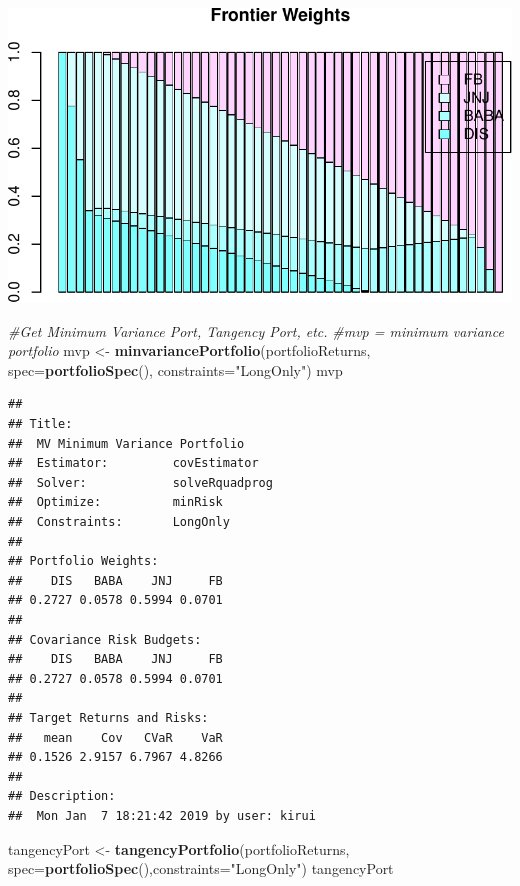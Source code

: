 \documentclass[]{article}
\newenvironment{Shaded}{\begin{snugshade}}{\end{snugshade}}
\newcommand{\KeywordTok}[1]{\textcolor[rgb]{0.13,0.29,0.53}{\textbf{#1}}}
\newcommand{\DataTypeTok}[1]{\textcolor[rgb]{0.13,0.29,0.53}{#1}}
\newcommand{\StringTok}[1]{\textcolor[rgb]{0.31,0.60,0.02}{#1}}
\newcommand{\CommentTok}[1]{\textcolor[rgb]{0.56,0.35,0.01}{\textit{#1}}}
\newcommand{\NormalTok}[1]{#1}
\begin{document}
\includegraphics{Markowitz_Research_Me_files/figure-latex/unnamed-chunk-20-6.pdf}

\begin{Shaded}
\begin{Highlighting}[]
\CommentTok{#Get Minimum Variance Port, Tangency Port, etc.}
\CommentTok{#mvp = minimum variance portfolio}
\NormalTok{mvp <-}\StringTok{ }\KeywordTok{minvariancePortfolio}\NormalTok{(portfolioReturns,}
                            \DataTypeTok{spec=}\KeywordTok{portfolioSpec}\NormalTok{(), }\DataTypeTok{constraints=}\StringTok{"LongOnly"}\NormalTok{)}
\NormalTok{mvp}
\end{Highlighting}
\end{Shaded}

\begin{verbatim}
## 
## Title:
##  MV Minimum Variance Portfolio 
##  Estimator:         covEstimator 
##  Solver:            solveRquadprog 
##  Optimize:          minRisk 
##  Constraints:       LongOnly 
## 
## Portfolio Weights:
##    DIS   BABA    JNJ     FB 
## 0.2727 0.0578 0.5994 0.0701 
## 
## Covariance Risk Budgets:
##    DIS   BABA    JNJ     FB 
## 0.2727 0.0578 0.5994 0.0701 
## 
## Target Returns and Risks:
##   mean    Cov   CVaR    VaR 
## 0.1526 2.9157 6.7967 4.8266 
## 
## Description:
##  Mon Jan  7 18:21:42 2019 by user: kirui
\end{verbatim}

\begin{Shaded}
\begin{Highlighting}[]
\NormalTok{tangencyPort <-}\StringTok{ }\KeywordTok{tangencyPortfolio}\NormalTok{(portfolioReturns,}
                                  \DataTypeTok{spec=}\KeywordTok{portfolioSpec}\NormalTok{(),}\DataTypeTok{constraints=}\StringTok{"LongOnly"}\NormalTok{)}
\NormalTok{tangencyPort}
\end{Highlighting}
\end{Shaded}
\end{document}
